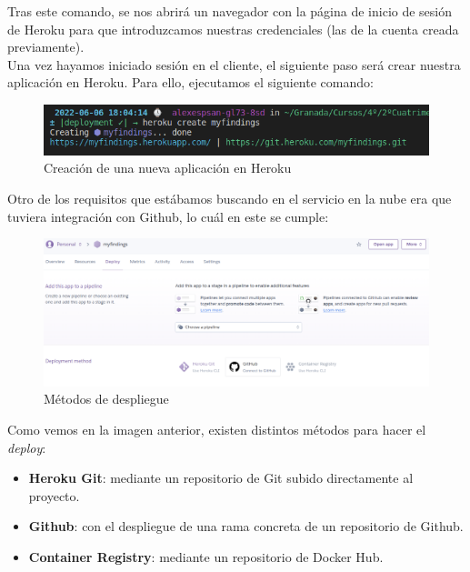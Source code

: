 Tras este comando, se nos abrirá un navegador con la página de inicio de sesión de Heroku
para que introduzcamos nuestras credenciales (las de la cuenta creada previamente).\\

Una vez hayamos iniciado sesión en el cliente, el siguiente paso será crear nuestra
aplicación en Heroku. Para ello, ejecutamos el siguiente comando:

    \begin{figure}[H]
        \centering
        \includegraphics[scale=0.55]{imagenes/heroku-create.png}
        \caption{Creación de una nueva aplicación en Heroku}
        \label{fig:heroku-create}
    \end{figure}

Otro de los requisitos que estábamos buscando en el servicio en la nube era que tuviera
integración con Github, lo cuál en este se cumple:

    \begin{figure}[H]
        \centering
        \includegraphics[scale=0.29]{imagenes/deployment-method.png}
        \caption{Métodos de despliegue}
        \label{fig:deployment-method}
    \end{figure}

Como vemos en la imagen anterior, existen distintos métodos para hacer el \textit{deploy}:

    \begin{itemize}
        \item \textbf{Heroku Git}: mediante un repositorio de Git subido directamente
        al proyecto.
        \item \textbf{Github}: con el despliegue de una rama concreta de un repositorio
        de Github.
        \item \textbf{Container Registry}: mediante un repositorio de Docker Hub.
    \end{itemize}

